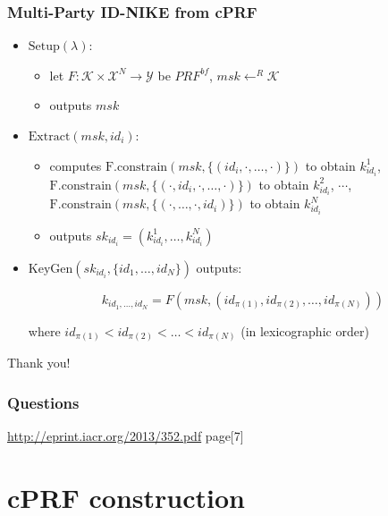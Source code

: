 \documentclass{beamer}
\begin{document}
\begin{frame}
\end{frame}

\begin{frame}
    \frametitle{Multi-Party ID-NIKE from cPRF}

\begin{itemize}
	\item $\mathrm{Setup}(\lambda)$:
		\begin{itemize}
			\item  let $F : \mathcal{K} \times \mathcal{X}^N \rightarrow \mathcal{Y}$ be $PRF^{bf}$, $msk \leftarrow^R \mathcal{K}$
			\item outputs $msk$
		\end{itemize}
	\item $\mathrm{Extract}(msk,id_i)$:
		\begin{itemize}
			\item  computes $\mathrm{F.constrain}(msk, \{(id_i, \cdot, \dots, \cdot)\})$ to obtain $k^{1}_{id_i}$, $\mathrm{F.constrain}(msk, \{(\cdot, id_i, \cdot, \dots, \cdot)\})$  to obtain $k^{2}_{id_i}$, $\cdots$,  $\mathrm{F.constrain}(msk, \{(\cdot, \dots, \cdot, id_i)\})$ to obtain $k^{N}_{id_i}$
			\item outputs $sk_{id_i} = (k^{1}_{id_i}, \dots, k^{N}_{id_i})$
		\end{itemize}
	\item $\mathrm{KeyGen}(sk_{id_i},\{id_1, \dots, id_N\})$ outputs:


\[ k_{id_1, \dots, id_N} = F(msk, (id_{\pi(1)}, id_{\pi(2)}, \dots, id_{\pi(N)})) \]

where $id_{\pi(1)} < id_{\pi(2)} < \dots < id_{\pi(N)}$ (in lexicographic order)

\end{itemize}

\end{frame}

\begin{frame}
\Huge{\centerline{Thank you!}}
\end{frame}

\begin{frame}
    \frametitle{Questions}
    \url{http://eprint.iacr.org/2013/352.pdf} page[7]
\end{frame}

\section{cPRF construction}
\end{document}
